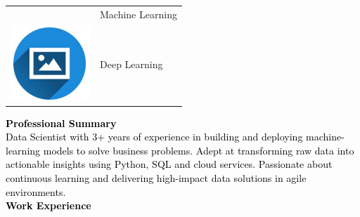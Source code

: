 \documentclass{article}
\begin{document}
\begin{paracol}{2}
\begin{tabular}{ll}
\begin{minipage}{0.1\linewidth}
         \end{minipage} & {Machine Learning} \\[10pt]
         \begin{minipage}{0.1\linewidth}
         \includegraphics[width=\linewidth]{picon.png}
         \end{minipage} & {Deep Learning} \\[10pt]
        \end{tabular}
        
\switchcolumn
\color{black}

\textcolor{black}{\Large \textbf{Professional Summary}} \\

\textcolor{black}{Data Scientist with 3+ years of experience in building and deploying machine-learning models to solve business problems. Adept at transforming raw data into actionable insights using Python, SQL and cloud services. Passionate about continuous learning and delivering high-impact data solutions in agile environments.}\\[8pt]

\textcolor{black}{\Large \textbf{Work Experience}} \\


\end{paracol}
\end{document}

